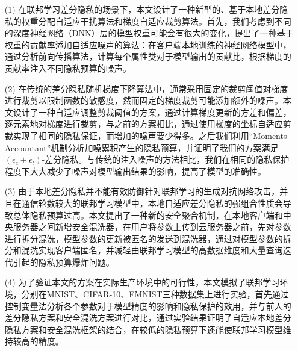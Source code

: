 \begin{enumerate}
\item [(1)] 在联邦学习差分隐私的场景下，本文设计了一种新型的、基于本地差分隐私的权重分配自适应干扰算法和梯度自适应裁剪算法。首先，我们考虑到不同的深度神经网络（DNN）层的模型权重可能会有很大的变化，提出了一种基于权重的贡献率添加自适应噪声的算法：在客户端本地训练的神经网络模型中，通过分析前向传播算法，计算每个属性类对于模型输出的贡献比，根据梯度的贡献率注入不同隐私预算的噪声。

\item [(2)]在传统的差分隐私随机梯度下降算法中，通常采用固定的裁剪阈值对梯度进行裁剪以限制函数的敏感度，然而固定的梯度裁剪可能添加额外的噪声。本文设计了一种自适应调整剪裁阈值的方案，通过计算梯度更新的方差和偏差，逐元素地对梯度进行裁剪，与之前的方案相比，通过使用梯度的坐标自适应剪裁实现了相同的隐私保证，而增加的噪声要少得多。之后我们利用“Moments Accountant”机制分析加噪累积产生的隐私预算，并证明了我们的方案满足$\left(\epsilon_{c}+\epsilon_{l}\right)$-差分隐私。与传统的注入噪声的方法相比，我们在相同的隐私保护程度下大大减少了噪声对模型输出结果的影响，提高了模型的准确性。

\item [(3)]由于本地差分隐私并不能有效防御针对联邦学习的生成对抗网络攻击，并且在通信轮数较大的联邦学习模型中，本地自适应差分隐私的强组合性质会导致总体隐私预算过高。本文提出了一种新的安全聚合机制，在本地客户端和中央服务器之间新增安全混洗器，在用户将参数上传到云服务器之前，先对参数进行拆分混洗，模型参数的更新被匿名的发送到混洗器，通过对模型参数的拆分和混洗实现客户端匿名，并减轻由联邦学习模型的高数据维度和大量查询迭代引起的隐私预算爆炸问题。

\item [(4)]为了验证本文的方案在实际生产环境中的可行性，本文模拟了联邦学习环境，分别在MNIST、CIFAR-10、FMNIST三种数据集上进行实验，首先通过控制变量法分析各个参数对于模型精度的影响和隐私保护的效用，并与前人的差分隐私方案和安全混洗方案进行对比，通过实验结果证明了自适应本地差分隐私方案和安全混洗框架的结合，在较低的隐私预算下还能使联邦学习模型维持较高的精度。
\end{enumerate}
\hspace{-0.5cm}
 
